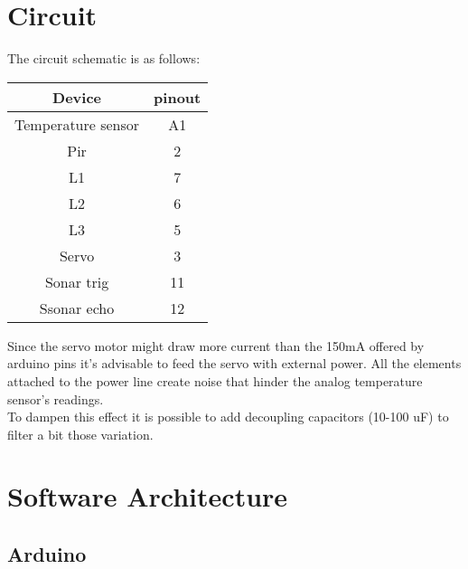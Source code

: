 \section{Circuit}
The circuit schematic is as follows:\\
\begin{center}
    \begin{tabular}{|c|c|}
        \hline
        Device             & pinout \\
        \hline
        \hline
        Temperature sensor & A1     \\
        \hline
        Pir                & 2      \\
        \hline
        L1                 & 7      \\
        \hline
        L2                 & 6      \\
        \hline
        L3                 & 5      \\
        \hline
        Servo              & 3      \\
        \hline
        Sonar trig         & 11     \\
        \hline
        Ssonar echo        & 12     \\
        \hline
    \end{tabular}
\end{center}
Since the servo motor might draw more current than the 150mA offered by arduino pins it's advisable to feed the servo with external power.
All the elements attached to the power line create noise that hinder the analog temperature sensor's readings.\\
To dampen this effect it is possible to add decoupling capacitors (10-100 uF) to filter a bit those variation.
\pagebreak


\section{Software Architecture}
\subsection{Arduino}

